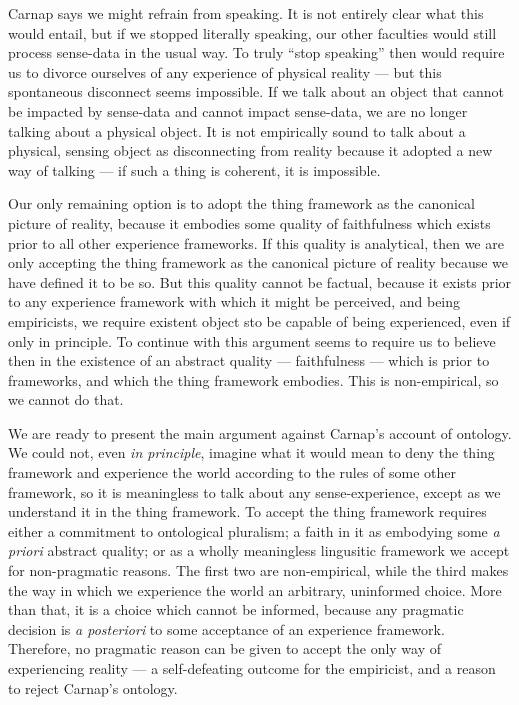 \documentclass[12pt]{article}
\begin{document}
Carnap says we might refrain from speaking. It is not entirely clear what this would entail, but if we stopped literally speaking, our other faculties would still process sense-data in the usual way. To truly ``stop speaking'' then would require us to divorce ourselves of any experience of physical reality --- but this spontaneous disconnect seems impossible. If we talk about an object that cannot be impacted by sense-data and cannot impact sense-data, we are no longer talking about a physical object. It is not empirically sound to talk about a physical, sensing object as disconnecting from reality because it adopted a new way of talking --- if such a thing is coherent, it is impossible.

Our only remaining option is to adopt the thing framework as the canonical picture of reality, because it embodies some quality of faithfulness which exists prior to all other experience frameworks. If this quality is analytical, then we are only accepting the thing framework as the canonical picture of reality because we have defined it to be so. But this quality cannot be factual, because it exists prior to any experience framework with which it might be perceived, and being empiricists, we require existent object sto be capable of being experienced, even if only in principle. To continue with this argument seems to require us to believe then in the existence of an abstract quality --- faithfulness --- which is prior to frameworks, and which the thing framework embodies. This is non-empirical, so we cannot do that.

We are ready to present the main argument against Carnap's account of ontology. We could not, even \textit{in principle}, imagine what it would mean to deny the thing framework and experience the world according to the rules of some other framework, so it is meaningless to talk about any sense-experience, except as we understand it in the thing framework. To accept the thing framework requires either a commitment to ontological pluralism; a faith in it as embodying some \textit{a priori} abstract quality; or as a wholly meaningless lingusitic framework we accept for non-pragmatic reasons. The first two are non-empirical, while the third makes the way in which we experience the world an arbitrary, uninformed choice. More than that, it is a choice which cannot be informed, because any pragmatic decision is \textit{a posteriori} to some acceptance of an experience framework. Therefore, no pragmatic reason can be given to accept the only way of experiencing reality --- a self-defeating outcome for the empiricist, and a reason to reject Carnap's ontology.
\end{document}
